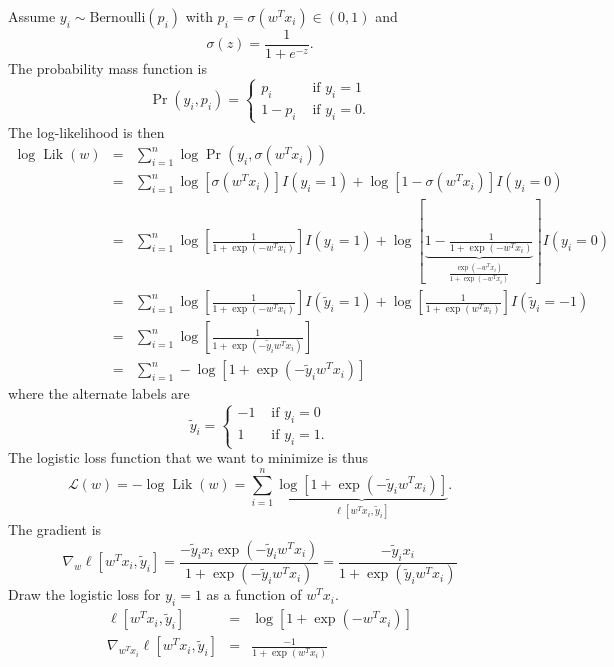 \documentclass{article}
\DeclareMathOperator*{\Lik}{Lik}
\begin{document}
Assume $y_i\sim \text{Bernoulli}(p_i)$ with
$p_i = \sigma(w^T x_i)\in(0,1)$ and
\begin{equation*}
  \sigma(z) = \frac{1}{1+e^{-z}}.
\end{equation*}
The probability mass function is
\begin{equation*}
  \Pr(y_i, p_i) =
  \begin{cases}
    p_i & \text{ if } y_i=1\\
    1-p_i & \text{ if } y_i=0.
  \end{cases}
\end{equation*}
The log-likelihood is then
\begin{eqnarray*}
  \log\Lik(w) &=& \sum_{i=1}^n\log \Pr(y_i, \sigma(w^T x_i))\\
&=& \sum_{i=1}^n \log[\sigma(w^T x_i)] I(y_i=1) + \log[1-\sigma(w^T x_i)] I(y_i=0)\\
&=& \sum_{i=1}^n \log[\frac{1}{1+\exp(-w^T x_i)}] I(y_i=1) + 
\log[\underbrace{1-\frac{1}{1+\exp(-w^T x_i)}}_{
\frac{\exp(-w^T x_i)}{1+\exp(-w^T x_i)}
}] I(y_i=0)\\
&=& \sum_{i=1}^n \log[\frac{1}{1+\exp(-w^T x_i)}] I(\tilde y_i=1) + 
\log[\frac{1}{1+\exp(w^T x_i)}] I(\tilde y_i=-1)\\
&=& \sum_{i=1}^n \log[\frac{1}{1+\exp(-\tilde y_i w^T x_i)}]\\
&=& \sum_{i=1}^n -\log[1+\exp(-\tilde y_i w^T x_i)]
\end{eqnarray*}
where the alternate labels are 
\begin{equation*}
  \tilde y_i =
  \begin{cases}
    -1 & \text{ if } y_i=0\\
    1 & \text{ if } y_i=1.
  \end{cases}
\end{equation*}
The logistic loss function that we want to minimize is thus
\begin{equation*}
  \mathcal L(w) = -\log\Lik(w) = \sum_{i=1}^n 
\underbrace{\log[1+\exp(-\tilde y_i w^T x_i)]}_{
\ell[w^T x_i, \tilde y_i]
}.
\end{equation*}
The gradient is
\begin{equation*}
\nabla_w \ell[w^T x_i, \tilde y_i] = \frac{
  -\tilde y_i x_i\exp(-\tilde y_i w^T x_i)
}{
  1+\exp(-\tilde y_i w^T x_i)
}=\frac{
  -\tilde y_i x_i
}{
  1+\exp(\tilde y_i w^T x_i)
}
\end{equation*}
Draw the logistic loss for $y_i=1$ as a function of $w^T x_i$. 
\begin{eqnarray*}
\ell[w^T x_i, \tilde y_i] &=& \log[1+\exp(- w^T x_i)] \\
\nabla_{w^T x_i} \ell[w^T x_i, \tilde y_i] &=& \frac{
  - 1
}{
  1+\exp( w^T x_i)
}
\end{eqnarray*}
\end{document}
